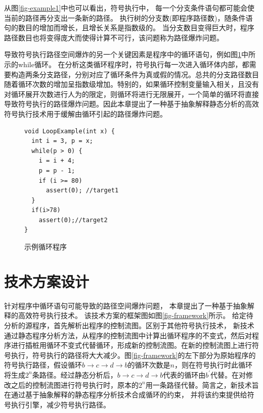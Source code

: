 从图\ref{fig-example1}中也可以看出，符号执行中，
每一个分支条件语句都可能会使当前的路径再分支出一条新的路径。
执行树的分支数(即程序路径数)，随条件语句的数目的增加而增长，且增长关系是指数级的。
当分支数目变得巨大时，程序路径数目也将变得庞大而使得计算不可行，该问题称为路径爆炸问题。

导致符号执行路径空间爆炸的另一个关键因素是程序中的循环语句，例如图\ref{fig-example2}中所示的while循环。
在分析这类循环程序时，符号执行每一次进入循环体内部，都需要构造两条分支路径，分别对应了循环条件为真或假的情况。总共的分支路径数目随着循环次数的增加呈指数级增加。特别的，如果循环控制变量输入相关，且没有对循环展开次数进行人为的限定，则循环将进行无限展开，一个简单的循环将直接导致符号执行的路径爆炸问题。因此本章提出了一种基于抽象解释静态分析的高效符号执行技术用于缓解由循环引起的路径爆炸问题。


\begin{figure}[h]
\begin{lstlisting}
void LoopExample(int x) {
  int i = 3, p = x;
  while(p > 0) {
    i = i + 4;
    p = p - 1;
	if (i >= 80)
	  assert(0); //target1
  }
  if(i>78)
  	assert(0);//target2
}
\end{lstlisting}
\caption{示例循环程序}
\label{fig-example2}
\end{figure}

\section{技术方案设计}
针对程序中循环语句可能导致的路径空间爆炸问题，
本章提出了一种基于抽象解释的高效符号执行技术。
该技术方案的框架图如图\ref{fig-framework}所示。
给定待分析的源程序，首先解析出程序的控制流图。区别于其他符号执行技术，
新技术通过静态程序分析方法，从程序的控制流图中计算出循环程序的不变式，然后对程序进行插桩用循环不变式代替循环，形成新的控制流图。在新的控制流图上进行符号执行，符号执行的路径将大大减少。图\ref{fig-framework}的左下部分为原始程序的符号执行路径，假设循环$b \rightarrow c \rightarrow d \rightarrow b$的循环次数是$n$，则在符号执行时此循环将生成$2^{n}$条路径。经过静态分析后，$b \rightarrow c \rightarrow d \rightarrow b$代表的循环由$b^{'}$代替。在对修改之后的控制流图进行符号执行时，原本的$2^{n}$用一条路径代替。简言之，新技术旨在通过基于抽象解释的静态程序分析技术合成循环的约束，
并将该约束提供给符号执行引擎，减少符号执行路径。

